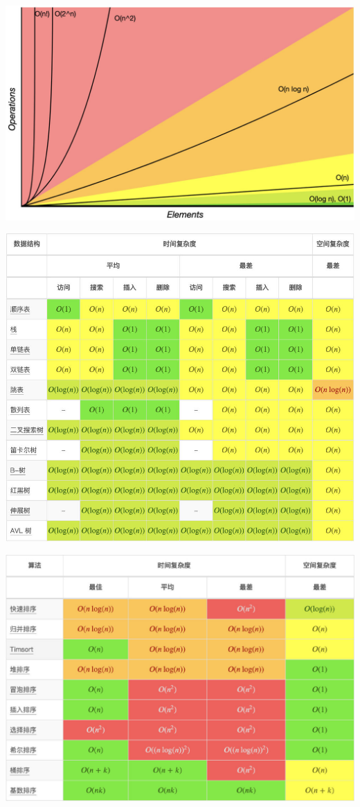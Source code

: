 \documentclass[9pt, b5paaper]{book}
\begin{document}
\includegraphics[width=.9\linewidth]{./pic/bigo.jpeg}

\includegraphics[width=.9\linewidth]{./pic/bigo2.jpeg}

\includegraphics[width=.9\linewidth]{./pic/bigo3.jpeg}
\end{document}
